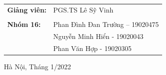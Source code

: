 \documentclass[a4paper]{article}
\theoremstyle{definition}
\begin{document}
\begin{titlepage}

    
    

\vskip 0.1in

\begin{table}[h!]
\centering
\begin{tabular}{ll}
\textbf{Giảng viên:} & PGS.TS Lê Sỹ Vinh\\
                     &                        \\
\textbf{Nhóm 16:}    & Phan Đình Đan Trường -- 19020475 \\
                     & Nguyễn Minh Hiển - 19020043 \\
                     & Phan Văn Hợp  - 19020305 \\
\end{tabular}
\end{table}



\vspace{1.5cm}
\begin{center}
{\footnotesize Hà Nội, Tháng 1/2022}
\end{center}
\end{titlepage}
\newpage
\end{document}

